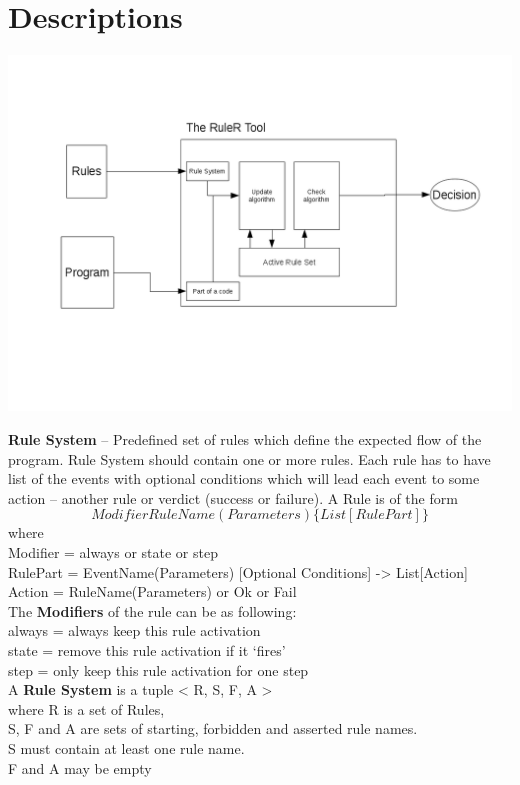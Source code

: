 \documentclass[a4paper]{article}
\begin{document}
\newpage
\section{Descriptions}
\includegraphics[width=\textwidth,height=\textheight,keepaspectratio]{../Graphs/overallProcess.png}

\vfill

\textbf{Rule System} – Predefined set of rules which define the expected flow of the program. Rule System should contain one or more rules. Each rule has to have list of the events with optional conditions which will lead each event to some action – another rule or verdict (success or failure). A Rule is of the form
\[
Modifier RuleName(Parameters) \{
List[RulePart]
\}
\]
where\\
Modifier = always or state or step\\
RulePart = EventName(Parameters) [Optional Conditions] -> List[Action]\\
Action = RuleName(Parameters) or Ok or Fail\\


The \textbf{Modifiers} of the rule can be as following:\\
always = always keep this rule activation\\
state = remove this rule activation if it ‘fires’\\
step = only keep this rule activation for one step\\

A \textbf{Rule System} is a tuple < R, S, F, A >\\
where R is a set of Rules,\\
S, F and A are sets of starting, forbidden and asserted rule names.\\
S must contain at least one rule name.\\
F and A may be empty 
\end{document}
